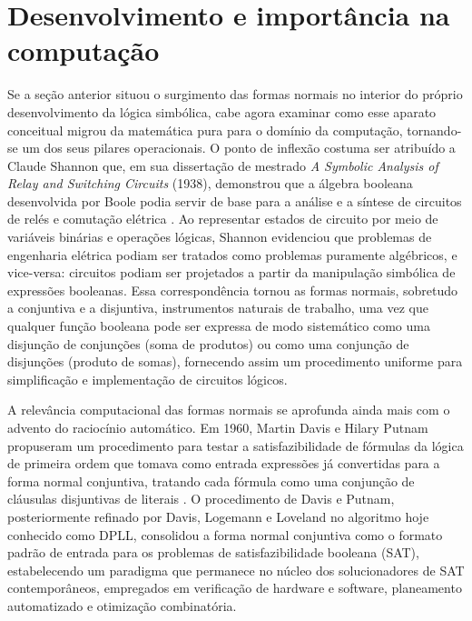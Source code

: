 \documentclass[12pt,a4paper,oneside]{report}
\theoremstyle{tituloplain}
\theoremstyle{titulodef}
\begin{document}
\section{Desenvolvimento e importância na computação}\label{sec:computacao}

Se a seção anterior situou o surgimento das formas normais no interior do próprio desenvolvimento da lógica simbólica, cabe agora examinar como esse aparato conceitual migrou da matemática pura para o domínio da computação, tornando-se um dos seus pilares operacionais. O ponto de inflexão costuma ser atribuído a Claude Shannon que, em sua dissertação de mestrado \textit{A Symbolic Analysis of Relay and Switching Circuits} (1938), demonstrou que a álgebra booleana desenvolvida por Boole podia servir de base para a análise e a síntese de circuitos de relés e comutação elétrica \cite{shannon1938}. Ao representar estados de circuito por meio de variáveis binárias e operações lógicas, Shannon evidenciou que problemas de engenharia elétrica podiam ser tratados como problemas puramente algébricos, e vice-versa: circuitos podiam ser projetados a partir da manipulação simbólica de expressões booleanas. Essa correspondência tornou as formas normais, sobretudo a conjuntiva e a disjuntiva, instrumentos naturais de trabalho, uma vez que qualquer função booleana pode ser expressa de modo sistemático como uma disjunção de conjunções (soma de produtos) ou como uma conjunção de disjunções (produto de somas), fornecendo assim um procedimento uniforme para simplificação e implementação de circuitos lógicos.

A relevância computacional das formas normais se aprofunda ainda mais com o advento do raciocínio automático. Em 1960, Martin Davis e Hilary Putnam propuseram um procedimento para testar a satisfazibilidade de fórmulas da lógica de primeira ordem que tomava como entrada expressões já convertidas para a forma normal conjuntiva, tratando cada fórmula como uma conjunção de cláusulas disjuntivas de literais \cite{davisputnam1960}. O procedimento de Davis e Putnam, posteriormente refinado por Davis, Logemann e Loveland no algoritmo hoje conhecido como DPLL, consolidou a forma normal conjuntiva como o formato padrão de entrada para os problemas de satisfazibilidade booleana (SAT), estabelecendo um paradigma que permanece no núcleo dos solucionadores de SAT contemporâneos, empregados em verificação de hardware e software, planeamento automatizado e otimização combinatória.
\end{document}
